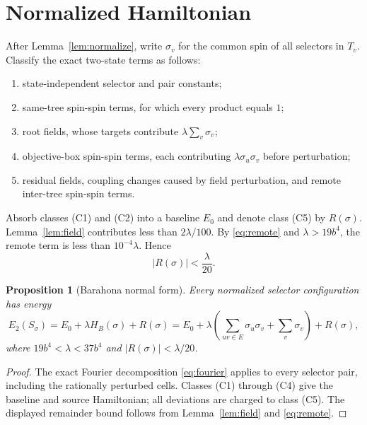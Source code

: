 \documentclass[12pt,a4paper]{article}
\newtheorem{proposition}[theorem]{Proposition}
\begin{document}
\section{Normalized Hamiltonian}\label{sec:normalized}

After Lemma~\ref{lem:normalize}, write $\sigma_v$ for the common spin of all selectors in $T_v$.  Classify the exact two-state terms as follows:
\begin{enumerate}[label=(C\arabic*)]
\item state-independent selector and pair constants;
\item same-tree spin-spin terms, for which every product equals $1$;
\item root fields, whose targets contribute $\lambda\sum_v\sigma_v$;
\item objective-box spin-spin terms, each contributing $\lambda\sigma_u\sigma_v$ before perturbation;
\item residual fields, coupling changes caused by field perturbation, and remote inter-tree spin-spin terms.
\end{enumerate}
Absorb classes (C1) and (C2) into a baseline $E_0$ and denote class (C5) by $R(\sigma)$.  Lemma~\ref{lem:field} contributes less than $2\lambda/100$.  By \eqref{eq:remote} and $\lambda>19b^4$, the remote term is less than $10^{-4}\lambda$.  Hence
\begin{equation}\label{eq:Rbound}
 |R(\sigma)|<\frac{\lambda}{20}.
\end{equation}

\begin{proposition}[Barahona normal form]\label{prop:normalform}
Every normalized selector configuration has energy
\begin{equation}\label{eq:normalform}
 E_2(S_\sigma)
 =E_0+\lambda H_B(\sigma)+R(\sigma)
 =E_0+\lambda\left(\sum_{uv\in E}\sigma_u\sigma_v+\sum_v\sigma_v\right)+R(\sigma),
\end{equation}
where $19b^4<\lambda<37b^4$ and $|R(\sigma)|<\lambda/20$.
\end{proposition}

\begin{proof}
The exact Fourier decomposition \eqref{eq:fourier} applies to every selector pair, including the rationally perturbed cells.  Classes (C1) through (C4) give the baseline and source Hamiltonian; all deviations are charged to class (C5).  The displayed remainder bound follows from Lemma~\ref{lem:field} and \eqref{eq:remote}.
\end{proof}
\end{document}
